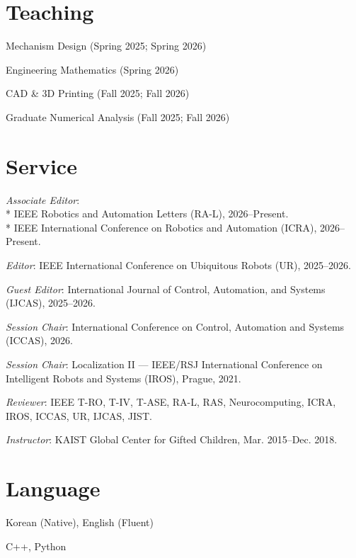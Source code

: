 \documentclass[margin]{res}
\begin{document}
\begin{resume}
		\section{Teaching}
		\par Mechanism Design (Spring 2025; Spring 2026)
		\par Engineering Mathematics (Spring 2026)
		\par CAD \& 3D Printing (Fall 2025; Fall 2026)
		\par Graduate Numerical Analysis (Fall 2025; Fall 2026)

		\section{Service}
		\par \textit{Associate Editor}:\\*
		IEEE Robotics and Automation Letters (RA-L), 2026--Present.\\*
		IEEE International Conference on Robotics and Automation (ICRA), 2026--Present.

		\par \textit{Editor}: IEEE International Conference on Ubiquitous Robots (UR), 2025--2026.

		\par \textit{Guest Editor}: International Journal of Control, Automation, and Systems (IJCAS), 2025--2026.

		\par \textit{Session Chair}: International Conference on Control, Automation and Systems (ICCAS), 2026.

		\par \textit{Session Chair}: Localization II --- IEEE/RSJ International Conference on Intelligent Robots and Systems (IROS), Prague, 2021.

		\par \textit{Reviewer}: IEEE T-RO, T-IV, T-ASE, RA-L, RAS, Neurocomputing, ICRA, IROS, ICCAS, UR, IJCAS, JIST.

		\par \textit{Instructor}: KAIST Global Center for Gifted Children, Mar. 2015--Dec. 2018.

		\section{Language}
		\par Korean (Native), English (Fluent)
		\par C++, Python
				
	\end{resume}
\end{document}
